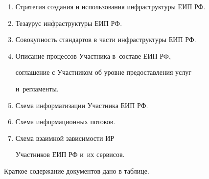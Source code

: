      \begin{enumerate}[1.]

\item Стратегия создания и использования инфраструктуры ЕИП РФ.

\item Тезаурус инфраструктуры ЕИП РФ.

\item Совокупность стандартов в части инфраструктуры ЕИП РФ.

\item Описание процессов Участника в~со\-ста\-ве ЕИП РФ,

соглашение с Участником об уровне предоставления услуг

и~регламенты.

\item Схема информатизации Участника ЕИП РФ.

\item Схема информационных потоков.

\item Схема взаимной зависимости ИР

Участников ЕИП РФ и~их сервисов.

\end{enumerate}



     Краткое содержание документов дано в таблице.



